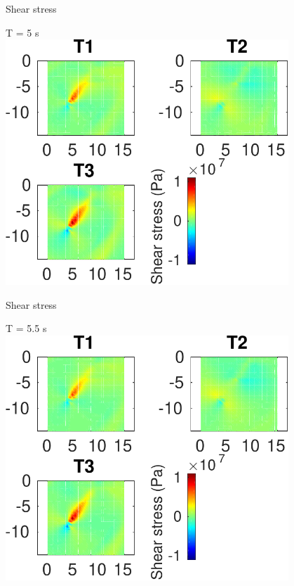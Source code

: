 \documentclass{beamer}
\begin{document}
\begin{frame}
 {Shear stress}
 
 \centering \Large T = 5 s\\
 \includegraphics[width=0.8\textwidth]{images/vertical_00056}
 
\end{frame}

\begin{frame}
 {Shear stress}
 
 \centering \Large T = 5.5 s\\
 \includegraphics[width=0.8\textwidth]{images/vertical_00061}
 
\end{frame}
\end{document}
